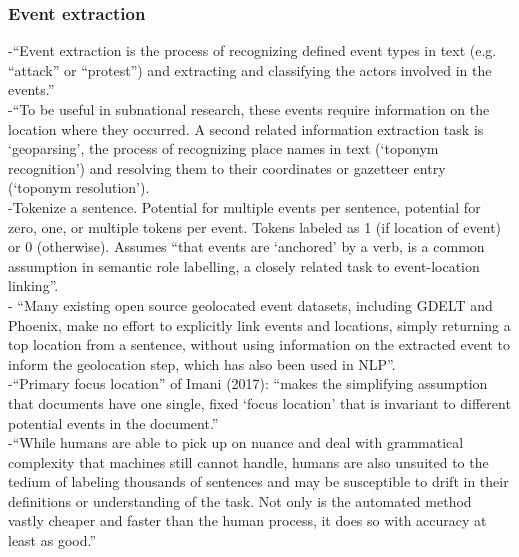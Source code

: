\subsubsection{Event extraction}
-{\color{orange}“Event extraction is the process of recognizing defined event types in text (e.g. “attack” or “protest”) and extracting and classifying the actors involved in the events.”\cite{Halterman2019}}\\
-{\color{orange}“To be useful in subnational research, these events require information on the location where they occurred. A second related information extraction task is ‘geoparsing’, the process of recognizing place names in text (‘toponym recognition’) and resolving them to their coordinates or gazetteer entry (‘toponym resolution’).\cite{Halterman2019}}\\
-{\color{orange}Tokenize a sentence. Potential for multiple events per sentence, potential for zero, one, or multiple tokens per event. Tokens labeled as 1 (if location of event) or 0 (otherwise). Assumes “that events are ‘anchored’ by a verb, is a common assumption in semantic role labelling, a closely related task to event-location linking”. \cite{Halterman2019}}\\
-{\color{orange} “Many existing open source geolocated event datasets, including GDELT and Phoenix, make no effort to explicitly link events and locations, simply returning a top location from a sentence, without using information on the extracted event to inform the geolocation step, which has also been used in NLP”.\cite{Halterman2019}}\\
-{\color{orange}“Primary focus location” of Imani (2017): “makes the simplifying assumption that documents have one single, fixed ‘focus location’ that is invariant to different potential events in the document.”\cite{Halterman2019}}\\
-{\color{orange}“While humans are able to pick up on nuance and deal with grammatical complexity that machines still cannot handle, humans are also unsuited to the tedium of labeling thousands of sentences and may be susceptible to drift in their definitions or understanding of the task. Not only is the automated method vastly cheaper and faster than the human process, it does so with accuracy at least as good.”\cite{Halterman2019}}\\
